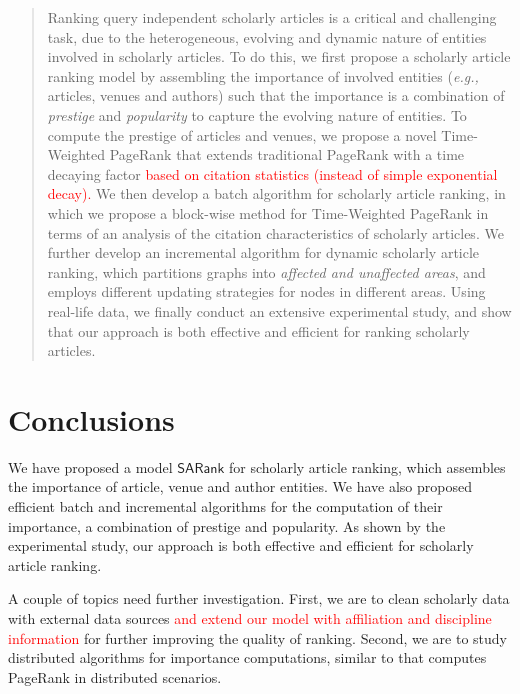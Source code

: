 \documentclass[10pt,conference,letterpaper]{IEEEtran}
\newcounter{prop}
\newcounter{fact}
\newcounter{alg}[section]
\newcommand{\marked}[1]{\textcolor{red}{#1}}
\newcommand{\eg}{\emph{e.g.,}\xspace}
\newcommand{\kw}[1]{{\ensuremath {\mathsf{#1}}}\xspace}
\newcommand{\ensemblerank}{\kw{SARank}}
\begin{document}
\begin{abstract}
Ranking query independent scholarly articles is a
critical and challenging task, due to the
heterogeneous, evolving and dynamic nature of entities involved in scholarly articles.
To do this, we first propose a scholarly article ranking model by assembling the importance of involved entities (\eg articles, venues and authors) such that the importance is a combination of {\em prestige} and {\em popularity} to capture the evolving nature of entities.
To compute the prestige of articles and venues, we propose a novel Time-Weighted PageRank that extends traditional PageRank with a time decaying factor \marked{based on citation statistics (instead of simple exponential decay).}
We then develop a batch algorithm for scholarly article ranking, in which we propose a block-wise method for Time-Weighted PageRank in terms of an analysis of the citation characteristics of scholarly articles. We further develop  an incremental algorithm for dynamic scholarly article ranking, which partitions graphs into {\em affected and unaffected areas}, and employs different updating strategies for nodes in different areas. Using real-life data, we finally conduct an extensive experimental study, and show that our approach is both effective and efficient for ranking scholarly articles.
\end{abstract}










\section{Conclusions}
\label{sec-conc}
We have proposed a model \ensemblerank for scholarly article ranking,
which assembles the importance of article, venue and author entities.
We have also proposed efficient batch and incremental algorithms for the computation of their importance, a combination of prestige and popularity.
As shown by the experimental study, our approach is both effective and efficient for scholarly article ranking.


A couple of topics need further investigation. First, we are to clean scholarly data with external data sources
\marked{and extend our model with affiliation and discipline information} for further improving the quality of ranking.
Second, we are to study distributed algorithms for importance computations, similar to \cite{ZhuYL05} that computes PageRank in distributed scenarios.
\end{document}
